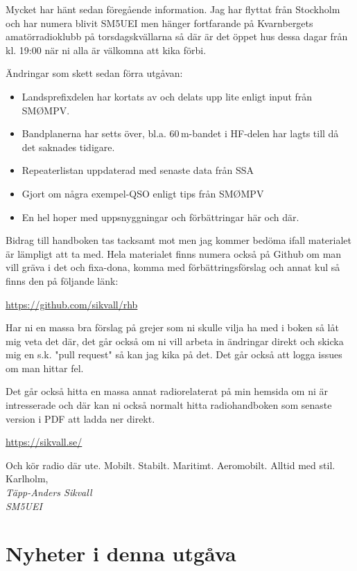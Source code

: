 Mycket har hänt sedan föregående information. Jag har flyttat från
Stockholm och har numera blivit SM5UEI men hänger fortfarande på
Kvarnbergets amatörradioklubb på torsdagskvällarna så där är det öppet
hus dessa dagar från kl. 19:00 när ni alla är välkomna att kika förbi.

Ändringar som skett sedan förra utgåvan:

\begin{itemize}[]
	\item Landsprefixdelen har kortats av och delats upp lite enligt 
	input från SMØMPV.
	\item Bandplanerna har setts över, bl.a. 60\,m-bandet i HF-delen 
	har lagts till då det saknades tidigare.
	\item Repeaterlistan uppdaterad med senaste data från SSA
	\item Gjort om några exempel-QSO enligt tips från SMØMPV
	\item En hel hoper med uppsnyggningar och förbättringar här och där.
\end{itemize}

Bidrag till handboken tas tacksamt mot men jag kommer bedöma ifall
materialet är lämpligt att ta med.  Hela materialet finns numera också
på Github om man vill gräva i det och fixa-dona, komma med 
förbättrings\-förslag och annat kul så finns den på följande länk:

\href{https://github.com/sikvall/rhb/}{https://github.com/sikvall/rhb}

Har ni en massa bra förslag på grejer som ni skulle vilja ha med i boken
så låt mig veta det där, det går också om ni vill arbeta in ändringar direkt
och skicka mig en s.k. "pull request" så kan jag kika på det. Det går också
att logga issues om man hittar fel.

Det går också hitta en massa annat radiorelaterat på min hemsida om ni 
är intresserade och där kan ni också normalt hitta radiohandboken som 
senaste version i PDF att ladda ner direkt.

\href{https://sikvall.se}{https://sikvall.se/}

Och kör radio där ute. Mobilt. Stabilt. Maritimt. Aeromobilt. Alltid med stil.\\[4em]

Karlholm, \DokumentDatum\\
\textit{Täpp-Anders Sikvall\\
	SM5UEI}

\clearpage

\section*{Nyheter i denna utgåva}

